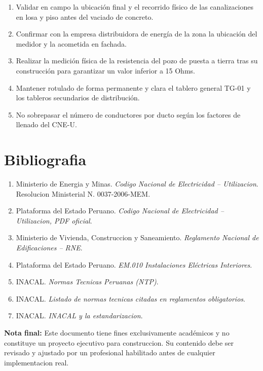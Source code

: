 \begin{enumerate}
  \item Validar en campo la ubicación final y el recorrido físico de las canalizaciones en losa y piso antes del vaciado de concreto.
  \item Confirmar con la empresa distribuidora de energía de la zona la ubicación del medidor y la acometida en fachada.
  \item Realizar la medición física de la resistencia del pozo de puesta a tierra tras su construcción para garantizar un valor inferior a 15 Ohms.
  \item Mantener rotulado de forma permanente y clara el tablero general TG-01 y los tableros secundarios de distribución.
  \item No sobrepasar el número de conductores por ducto según los factores de llenado del CNE-U.
\end{enumerate}

\section{Bibliografia}

\begin{enumerate}
  \item Ministerio de Energia y Minas. \textit{Codigo Nacional de Electricidad -- Utilizacion}. Resolucion Ministerial N. 0037-2006-MEM.
  \item Plataforma del Estado Peruano. \textit{Codigo Nacional de Electricidad -- Utilizacion, PDF oficial}.
  \item Ministerio de Vivienda, Construccion y Saneamiento. \textit{Reglamento Nacional de Edificaciones -- RNE}.
  \item Plataforma del Estado Peruano. \textit{EM.010 Instalaciones Eléctricas Interiores}.
  \item INACAL. \textit{Normas Tecnicas Peruanas (NTP)}.
  \item INACAL. \textit{Listado de normas tecnicas citadas en reglamentos obligatorios}.
  \item INACAL. \textit{INACAL y la estandarizacion}.
\end{enumerate}

\bigskip

\noindent\textbf{Nota final:} Este documento tiene fines exclusivamente académicos y no constituye un proyecto ejecutivo para construccion. Su contenido debe ser revisado y ajustado por un profesional habilitado antes de cualquier implementacion real.
